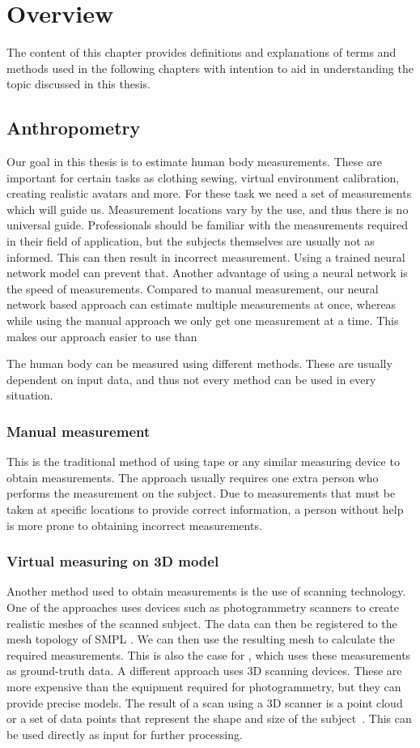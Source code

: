 \chapter{Overview}
The content of this chapter provides definitions and explanations of terms and methods used in the following chapters with intention to aid in understanding the topic discussed in this thesis.

\section{Anthropometry}
Our goal in this thesis is to estimate human body measurements. These are important for certain tasks as clothing sewing, virtual environment calibration, creating realistic avatars and more. For these task we need a set of measurements which will guide us. Measurement locations vary by the use, and thus there is no universal guide. Professionals should be familiar with the measurements required in their field of application, but the subjects themselves are usually not as informed. This can then result in incorrect measurement. Using a trained neural network model can prevent that. Another advantage of using a neural network is the speed of measurements. Compared to manual measurement, our neural network based approach can estimate multiple measurements at once, whereas while using the manual approach we only get one measurement at a time. This makes our approach easier to use than 

The human body can be measured using different methods. These are usually dependent on input data, and thus not every method can be used in every situation.  

\subsection{Manual measurement}
This is the traditional method of using tape or any similar measuring device to obtain measurements. The approach usually requires one extra person who performs the measurement on the subject. Due to measurements that must be taken at specific locations to provide correct information, a person without help is more prone to obtaining incorrect measurements.


\subsection{Virtual measuring on 3D model}
Another method used to obtain measurements is the use of scanning technology. One of the approaches uses devices such as photogrammetry scanners to create realistic meshes of the scanned subject. The data can then be registered to the mesh topology of SMPL \cite{smpl}. We can then use the resulting mesh to calculate the required measurements. This is also the case for \cite{BodyM}, which uses these measurements as ground-truth data. 
A different approach uses 3D scanning devices. These are more expensive than the equipment required for photogrammetry, but they can provide precise models. The result of a scan using a 3D scanner is a point cloud or a set of data points that represent the shape and size of the subject~\cite{3dScan}. This can be used directly as input for further processing.
